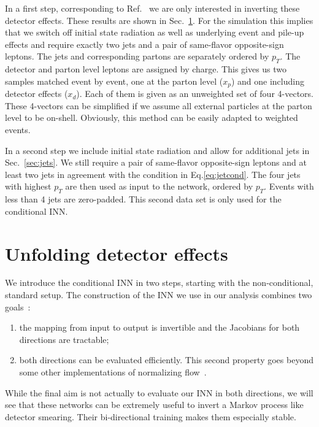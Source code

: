 In a first step, corresponding to Ref.~\cite{fcgan} we are only
interested in inverting these detector effects. These results are
shown in Sec.~\ref{sec:inn}. For the simulation this implies that we
switch off initial state radiation as well as underlying event and
pile-up effects and require exactly two jets and a pair of same-flavor
opposite-sign leptons. The jets and corresponding partons are
separately ordered by $p_T$. The detector and parton level leptons are
assigned by charge. This gives us two samples matched event by event,
one at the parton level ($x_p$) and one including detector effects
($x_d$).  Each of them is given as an unweighted set of four
4-vectors. These 4-vectors can be simplified if we assume all external
particles at the parton level to be on-shell. Obviously, this
method can be easily adapted to weighted events.

In a second step we include initial state radiation and allow for
additional jets in Sec.~\ref{sec:jets}.  We still require a pair of
same-flavor opposite-sign leptons and at least two jets in agreement
with the condition in Eq.\eqref{eq:jetcond}. The four jets with
highest $p_T$ are then used as input to the network, ordered by
$p_T$. Events with less than 4 jets are zero-padded. This second
data set is only used for the conditional INN.

\section{Unfolding detector effects}
\label{sec:inn}

We introduce the conditional INN in two steps, starting with the
non-conditional, standard setup. The construction of the INN we use in
our analysis combines two goals~\cite{inn}:
%
\begin{enumerate}
\item the mapping from input to output is invertible and the Jacobians
  for both directions are tractable;
\item both directions can be evaluated efficiently. This second
  property goes beyond some other implementations of normalizing
  flow~\cite{nflow1,nflow_review}.
\end{enumerate}
%
While the final aim is not actually to evaluate our INN in both directions, we will
see that these networks can be extremely useful to invert a Markov
process like detector smearing. Their bi-directional training makes
them especially stable.

